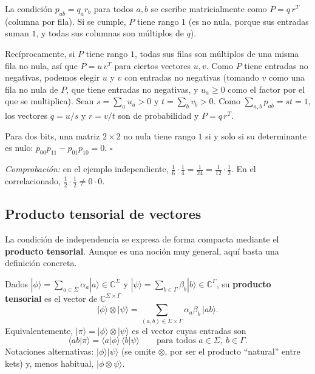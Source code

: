\documentclass[11pt, a4paper, twoside, openright]{report}
\begin{document}
\begin{tcolorbox}[colback=gray!5!white,colframe=gray!75!black,title=\textbf{Demostración}]
La condición $p_{ab} = q_a r_b$ para todos $a, b$ se escribe matricialmente como $P = q\, r^T$ (columna por fila). Si se cumple, $P$ tiene rango $1$ (es no nula, porque sus entradas suman $1$, y todas sus columnas son múltiplos de $q$).

Recíprocamente, si $P$ tiene rango $1$, todas sus filas son múltiplos de una misma fila no nula, así que $P = u\, v^T$ para ciertos vectores $u, v$. Como $P$ tiene entradas no negativas, podemos elegir $u$ y $v$ con entradas no negativas (tomando $v$ como una fila no nula de $P$, que tiene entradas no negativas, y $u_a \ge 0$ como el factor por el que se multiplica). Sean $s = \sum_a u_a > 0$ y $t = \sum_b v_b > 0$. Como $\sum_{a,b} p_{ab} = st = 1$, los vectores $q = u/s$ y $r = v/t$ son de probabilidad y $P = q\,r^T$.

Para dos bits, una matriz $2 \times 2$ no nula tiene rango $1$ si y solo si su determinante es nulo: $p_{00}p_{11} - p_{01}p_{10} = 0$. \hfill $\square$

\textit{Comprobación:} en el ejemplo independiente, $\frac16 \cdot \frac14 = \frac1{24} = \frac1{12}\cdot\frac12$. En el correlacionado, $\frac12 \cdot \frac12 \neq 0 \cdot 0$.
\end{tcolorbox}

\subsection{Producto tensorial de vectores}

\noindent La condición de independencia se expresa de forma compacta mediante el \textbf{producto tensorial}. Aunque es una noción muy general, aquí basta una definición concreta.

\begin{tcolorbox}[colback=teal!5!white,colframe=teal!75!black,title=\textbf{Definición: Producto tensorial de vectores}]
Dados $|\phi\rangle = \sum_{a \in \Sigma} \alpha_a |a\rangle \in \mathbb{C}^\Sigma$ y $|\psi\rangle = \sum_{b \in \Gamma} \beta_b |b\rangle \in \mathbb{C}^\Gamma$, su \textbf{producto tensorial} es el vector de $\mathbb{C}^{\Sigma \times \Gamma}$
\[ |\phi\rangle \otimes |\psi\rangle = \sum_{(a,b) \in \Sigma \times \Gamma} \alpha_a \beta_b\, |ab\rangle. \]
Equivalentemente, $|\pi\rangle = |\phi\rangle \otimes |\psi\rangle$ es el vector cuyas entradas son
\[ \langle ab|\pi\rangle = \langle a|\phi\rangle\,\langle b|\psi\rangle \qquad \text{para todos } a \in \Sigma,\ b \in \Gamma. \]
Notaciones alternativas: $|\phi\rangle|\psi\rangle$ (se omite $\otimes$, por ser el producto ``natural'' entre kets) y, menos habitual, $|\phi \otimes \psi\rangle$.
\end{tcolorbox}
\end{document}

